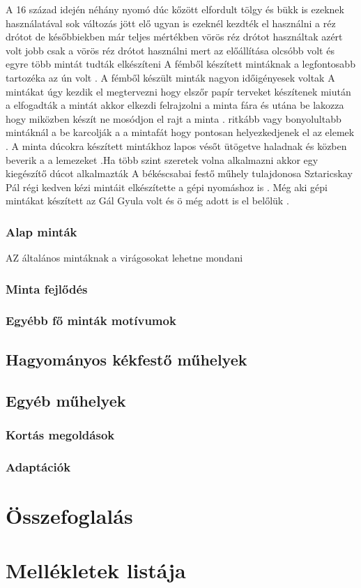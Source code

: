 \documentclass[fontsize=12pt, appendixprefix=true]{scrreprt}
\begin{document}
A 16  század idején néhány nyomó dúc kőzött elfordult tölgy és  bükk is ezeknek használatával sok változás jött elő
ugyan is ezeknél kezdték el használni a réz drótot de későbbiekben már teljes mértékben vörös réz drótot használtak
azért volt jobb csak a vörös réz drótot használni mert az előállítása olcsóbb volt és egyre több mintát tudták elkészíteni 
A fémből készített mintáknak a legfontosabb tartozéka az ún volt .
A fémből készült minták nagyon időigényesek voltak 
A mintákat úgy kezdik el megtervezni hogy elszőr papír terveket készítenek miután a elfogadták a mintát akkor elkezdi felrajzolni a minta fára és utána be lakozza hogy miközben készít ne mosódjon el rajt a minta .
ritkább vagy bonyolultabb mintáknál a be karcolják a a mintafát hogy pontosan helyezkedjenek el az elemek .
A minta dúcokra készített mintákhoz lapos vésőt ütögetve haladnak  és közben beverik a a lemezeket .Ha több szint szeretek volna alkalmazni akkor egy kiegészítő dúcot alkalmazták 
A békéscsabai festő műhely tulajdonosa Sztaricskay Pál  régi kedven kézi mintáit elkészítette a gépi nyomáshoz is .
Még aki gépi mintákat készített az Gál Gyula volt és ö még adott is el belőlük .







\subsection{Alap minták}
AZ általános mintáknak a virágosokat lehetne mondani 
\subsection{Minta fejlődés}
\subsection{Egyébb fő minták motívumok}
\section{Hagyományos kékfestő műhelyek}
\section{Egyéb műhelyek}
\subsection{Kortás megoldások}
\subsection{Adaptációk}

\chapter{Összefoglalás} 


\printbibliography
\renewcommand{\appendixname}{Függelék}  %
\appendix
\chapter{Mellékletek listája}
\end{document}
